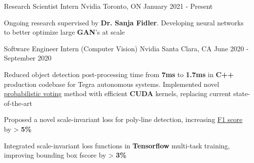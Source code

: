 
\begin{cventries}
  \cventry
    {Research Scientist Intern} %
    {Nvidia} %
    {Toronto, ON} %
    {January 2021 - Present} %
    {
      \begin{cvitems} %
        \item {Ongoing research supervised by \textbf{Dr. Sanja Fidler}. Developing neural networks to better optimize large \textbf{GAN}'s at scale}
      \end{cvitems}
    }
  
  \cventry
    {Software Engineer Intern (Computer Vision)} %
    {Nvidia} %
    {Santa Clara, CA} %
    {June 2020 - September 2020} %
    {
      \begin{cvitems} %
        \item {Reduced object detection post-processing time from \textbf{7ms}
        to \textbf{1.7ms} in \textbf{C++} production codebase for Tegra
        autonomous systems. Implemented novel \underline{probabilistic voting}
        method with efficient \textbf{CUDA} kernels, replacing current
        state-of-the-art}
        \item {Proposed a novel scale-invariant loss for poly-line detection, increasing \underline{F1 score} by > \textbf{5\%}}
        \item {Integrated scale-invariant loss functions in \textbf{Tensorflow} multi-task training, improving bounding box fscore by > \textbf{3\%}}
      \end{cvitems}
    }


\end{cventries}
